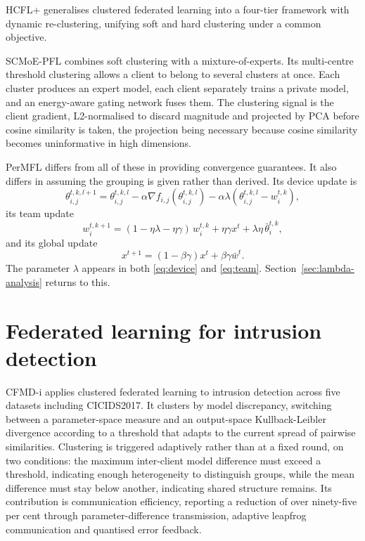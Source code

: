 HCFL+ \parencite{hcfl-2025} generalises clustered federated learning into a
four-tier framework with dynamic re-clustering, unifying soft and hard
clustering under a common objective.

SCMoE-PFL \parencite{scmoe-2026} combines soft clustering with a
mixture-of-experts. Its multi-centre threshold clustering allows a client to
belong to several clusters at once. Each cluster produces an expert model, each
client separately trains a private model, and an energy-aware gating network
fuses them. The clustering signal is the client gradient, L2-normalised to
discard magnitude and projected by PCA before cosine similarity is taken, the
projection being necessary because cosine similarity becomes uninformative in
high dimensions.

PerMFL \parencite{permfl-2024} differs from all of these in providing
convergence guarantees. It also differs in assuming the grouping is given
rather than derived. Its device update is
\begin{equation}
\theta_{i,j}^{t,k,l+1} = \theta_{i,j}^{t,k,l} - \alpha\nabla f_{i,j}(\theta_{i,j}^{t,k,l}) - \alpha\lambda\left(\theta_{i,j}^{t,k,l} - w_i^{t,k}\right),
\label{eq:device}
\end{equation}
its team update
\begin{equation}
w_i^{t,k+1} = (1 - \eta\lambda - \eta\gamma)\,w_i^{t,k} + \eta\gamma x^t + \lambda\eta\,\bar{\theta}_i^{t,k},
\label{eq:team}
\end{equation}
and its global update
\begin{equation}
x^{t+1} = (1 - \beta\gamma)x^t + \beta\gamma\bar{w}^t.
\label{eq:global}
\end{equation}
The parameter $\lambda$ appears in both \eqref{eq:device} and \eqref{eq:team}.
Section~\ref{sec:lambda-analysis} returns to this.

\section{Federated learning for intrusion detection}
\label{sec:fl-ids}

CFMD-i \parencite{cfmdi-2026} applies clustered federated learning to intrusion
detection across five datasets including CICIDS2017. It clusters by model
discrepancy, switching between a parameter-space measure and an output-space
Kullback-Leibler divergence according to a threshold that adapts to the current
spread of pairwise similarities. Clustering is triggered adaptively rather than
at a fixed round, on two conditions: the maximum inter-client model difference
must exceed a threshold, indicating enough heterogeneity to distinguish groups,
while the mean difference must stay below another, indicating shared structure
remains. Its contribution is communication efficiency, reporting a reduction of
over ninety-five per cent through parameter-difference transmission, adaptive
leapfrog communication and quantised error feedback.

